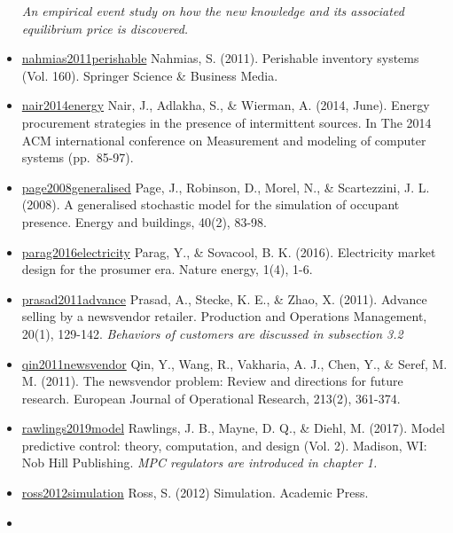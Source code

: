 \documentclass[letterpaper,8pt,twocolumn,twoside,]{pinp}
\begin{document}
\begin{itemize}
  \emph{An empirical event study on how the new knowledge and its
  associated equilibrium price is discovered.}
\item
  \href{https://www.springer.com/gp/book/9781441979988}{nahmias2011perishable}
  Nahmias, S. (2011). Perishable inventory systems (Vol. 160). Springer
  Science \& Business Media.
\item
  \href{https://dl.acm.org/doi/10.1145/2591971.2591982}{nair2014energy}
  Nair, J., Adlakha, S., \& Wierman, A. (2014, June). Energy procurement
  strategies in the presence of intermittent sources. In The 2014 ACM
  international conference on Measurement and modeling of computer
  systems (pp.~85-97).
\item
  \href{https://www.sciencedirect.com/science/article/pii/S037877880700031X}{page2008generalised}
  Page, J., Robinson, D., Morel, N., \& Scartezzini, J. L. (2008). A
  generalised stochastic model for the simulation of occupant presence.
  Energy and buildings, 40(2), 83-98.
\item
  \href{https://www.nature.com/articles/nenergy201632}{parag2016electricity}
  Parag, Y., \& Sovacool, B. K. (2016). Electricity market design for
  the prosumer era. Nature energy, 1(4), 1-6.
\item
  \href{https://onlinelibrary.wiley.com/doi/abs/10.1111/j.1937-5956.2010.01133.x?casa_token=lVRyRU67RhMAAAAA:8Dj0zKFhuT8i_4hkKs0PDvKRC3RUMLWaJk_poEYL7Z9oYcOJVB4-ZsEuT18KN15fuZcrCWLtaAeNayg}{prasad2011advance}
  Prasad, A., Stecke, K. E., \& Zhao, X. (2011). Advance selling by a
  newsvendor retailer. Production and Operations Management, 20(1),
  129-142. \emph{Behaviors of customers are discussed in subsection 3.2}
\item
  \href{https://www.sciencedirect.com/science/article/pii/S0377221710008040}{qin2011newsvendor}
  Qin, Y., Wang, R., Vakharia, A. J., Chen, Y., \& Seref, M. M. (2011).
  The newsvendor problem: Review and directions for future research.
  European Journal of Operational Research, 213(2), 361-374.
\item
  \href{https://sites.engineering.ucsb.edu/~jbraw/mpc/}{rawlings2019model}
  Rawlings, J. B., Mayne, D. Q., \& Diehl, M. (2017). Model predictive
  control: theory, computation, and design (Vol. 2). Madison, WI: Nob
  Hill Publishing. \emph{MPC regulators are introduced in chapter 1.}
\item
  \href{https://www.elsevier.com/books/simulation/ross/978-0-12-415825-2}{ross2012simulation}
  Ross, S. (2012) Simulation. Academic Press.
\item

\end{itemize}
\end{document}
